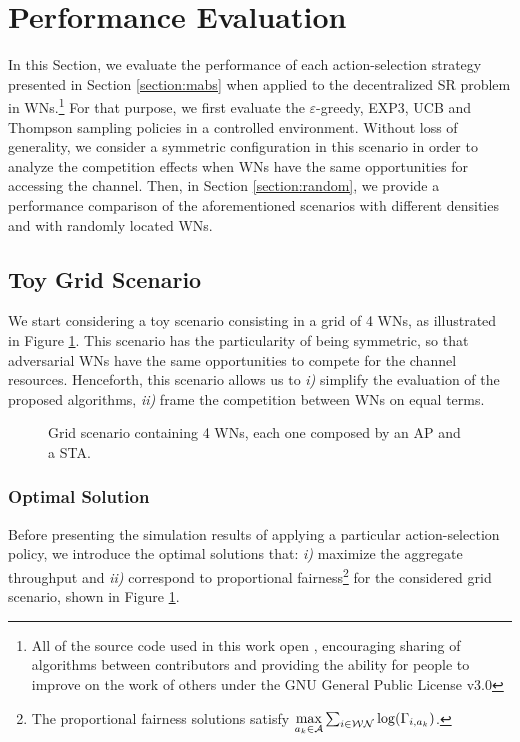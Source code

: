 \documentclass[preprint,12pt]{elsarticle}
\begin{document}
\section{Performance Evaluation}
\label{section:performance_evaluation}	
In this Section, we evaluate the performance of each action-selection strategy presented in Section \ref{section:mabs} when applied to the decentralized SR problem in WNs.\footnote{All of the source code used in this work open \cite{fwilhelmi2017code}, encouraging sharing of algorithms between contributors and providing the ability for people to improve on the work of others under the GNU General Public License v3.0} For that purpose, we first evaluate the $\varepsilon$-greedy, EXP3, UCB and Thompson sampling policies in a controlled environment. Without loss of generality, we consider a symmetric configuration in this scenario in order to analyze the competition effects when WNs have the same opportunities for accessing the channel. Then, in Section \ref{section:random}, we provide a performance comparison of the aforementioned scenarios with different densities and with randomly located WNs.	

\subsection{Toy Grid Scenario}		
\label{section:toy_grid_scenario}	
We start considering a toy scenario consisting in a grid of 4 WNs, as illustrated in Figure \ref{fig:scenario}. This scenario has the particularity of being symmetric, so that adversarial WNs have the same opportunities to compete for the channel resources. Henceforth, this scenario allows us to \emph{i)} simplify the evaluation of the proposed algorithms, \emph{ii)} frame the competition between WNs on equal terms.

\begin{figure}[t!]
	\centering											
	\caption{Grid scenario containing 4 WNs, each one composed by an AP and a STA.}
	\label{fig:scenario}
\end{figure}

\subsubsection{Optimal Solution}
\label{section:optimal_solution}	
Before presenting the simulation results of applying a particular action-selection policy, we introduce the optimal solutions that: \emph{i)} maximize the aggregate throughput and \emph{ii)} correspond to proportional fairness\footnote{The proportional fairness solutions satisfy $\underset{a_k \in \mathcal{A}}{\rm max} \sum_{i \in \mathcal{WN}} \log(\Gamma_{i,a_k})$.} for the considered grid scenario, shown in Figure \ref{fig:scenario}.  %
\end{document}
